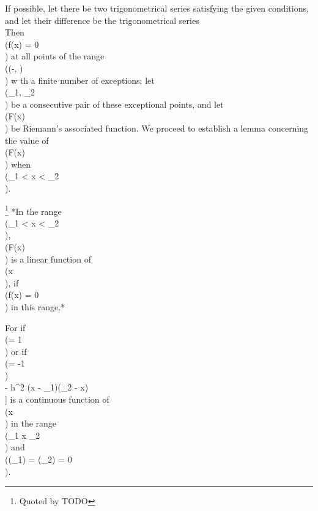 If possible, let there be two trigonometrical series satisfying the
given conditions, and let their difference be the trigonometrical
series
\\[ 
A_{0}
+
\sum_{n=1}^{\infty} A_{n}(x)
=
f(x).
\\] 

Then \\(f(x) = 0\\) at all points of the range \\((-\pi, \pi)\\) w th a finite number
of exceptions; let \\(\xi_{1}, \xi_{2}\\) be a consecutive pair of these exceptional
points, and let \\(F(x)\\) be Riemann's associated function. We proceed to establish a
lemma concerning the value of \\(F(x)\\) when \\(\xi_{1} < x < \xi_{2}\\).

\footnote{Quoted by TODO} *In the range \\(\xi_{1} < x < \xi_{2}\\),
  \\(F(x)\\) is a linear function of \\(x\\), if \\(f(x) = 0\\) in this range.*

For if \\(\theta = 1\\) or if \\(\theta = -1\\)
\\[ 
\phi(x)
=
\theta \left[
  F(x)
  - F(\xi_{1})
  - \frac{x - \xi_{1}}{\xi_{2} - \xi_{1}} \left\{
    F(\xi_{2}) - F(\xi_{1})
  \right\}
\right]
-
 h^{2} (x - \xi_{1})(\xi_{2} - x)
\\] 
is a continuous function of \\(x\\) in the range
\\(\xi_{1} \leq x \leq \xi_{2}\\) and \\(\phi(\xi_{1}) = \phi(\xi_{2}) = 0\\).
%
%

